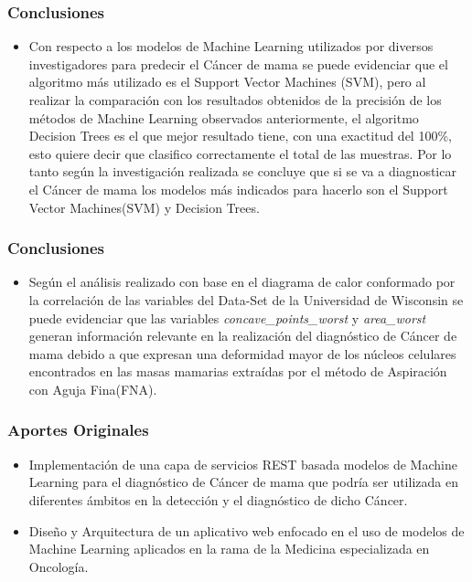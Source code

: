 \documentclass[xcolor=dvipsnames,xcolor=table]{beamer} %
\begin{document}
\begin{frame}
	\frametitle{Conclusiones}
	\begin{itemize}\justifying
	\item Con respecto a los modelos de Machine Learning utilizados por diversos investigadores para predecir el Cáncer de mama se puede evidenciar que el algoritmo más utilizado es el Support Vector Machines (SVM), pero al realizar la comparación con los resultados obtenidos de la precisión de los métodos de Machine Learning observados anteriormente, el algoritmo Decision Trees es el que mejor resultado tiene, con una exactitud del 100\%, esto quiere decir que clasifico correctamente el total de las muestras. Por lo tanto según la investigación realizada  se concluye que si se va a diagnosticar el Cáncer de mama los modelos más indicados para hacerlo son el Support Vector Machines(SVM) y Decision Trees.
	\end{itemize}
\end{frame}
\begin{frame}
	\frametitle{Conclusiones}
	\begin{itemize}\justifying
		\item Según el análisis realizado con base en el diagrama de calor conformado por la correlación de las variables del Data-Set de la Universidad de Wisconsin se puede evidenciar que  las variables \textit{concave\_points\_worst} y \textit{area\_worst} generan información relevante en la realización del diagnóstico de Cáncer de mama debido a  que expresan  una deformidad mayor de los núcleos celulares encontrados en las masas mamarias extraídas por el método de Aspiración con Aguja Fina(FNA).
	\end{itemize}
\end{frame}
\begin{frame}
	\frametitle{Aportes Originales}
	\begin{itemize}\justifying
		\item Implementación de una capa de servicios REST basada modelos de Machine Learning para el diagnóstico de Cáncer de mama que podría ser utilizada en diferentes ámbitos en la detección y el diagnóstico de dicho Cáncer.
		
		\item Diseño y Arquitectura de un aplicativo web enfocado en el uso de modelos de Machine Learning aplicados en la rama de la Medicina especializada en Oncología.
	\end{itemize}
\end{frame}
\end{document}
